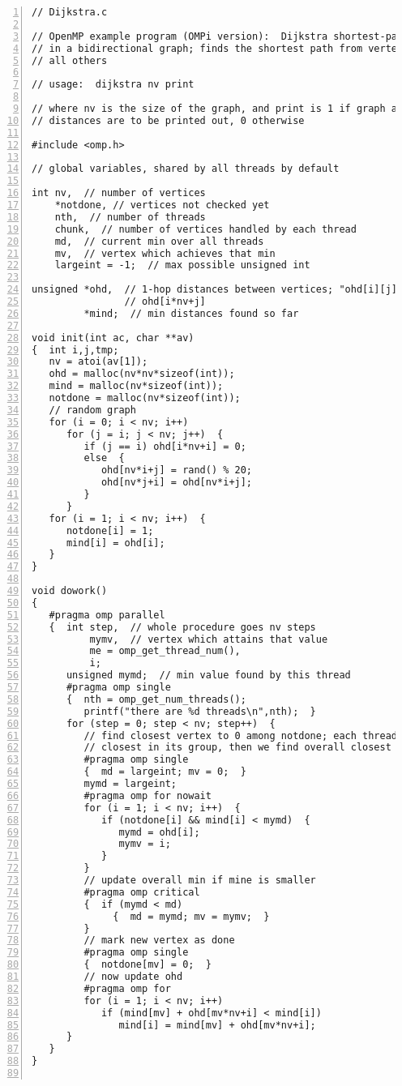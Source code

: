 \begin{Verbatim}[fontsize=\relsize{-2},numbers=left]
// Dijkstra.c

// OpenMP example program (OMPi version):  Dijkstra shortest-path finder
// in a bidirectional graph; finds the shortest path from vertex 0 to
// all others

// usage:  dijkstra nv print

// where nv is the size of the graph, and print is 1 if graph and min
// distances are to be printed out, 0 otherwise

#include <omp.h>

// global variables, shared by all threads by default

int nv,  // number of vertices
    *notdone, // vertices not checked yet
    nth,  // number of threads
    chunk,  // number of vertices handled by each thread
    md,  // current min over all threads
    mv,  // vertex which achieves that min
    largeint = -1;  // max possible unsigned int

unsigned *ohd,  // 1-hop distances between vertices; "ohd[i][j]" is
                // ohd[i*nv+j]
         *mind;  // min distances found so far

void init(int ac, char **av)
{  int i,j,tmp;
   nv = atoi(av[1]);
   ohd = malloc(nv*nv*sizeof(int));
   mind = malloc(nv*sizeof(int));
   notdone = malloc(nv*sizeof(int));
   // random graph
   for (i = 0; i < nv; i++)
      for (j = i; j < nv; j++)  {
         if (j == i) ohd[i*nv+i] = 0;
         else  {
            ohd[nv*i+j] = rand() % 20;
            ohd[nv*j+i] = ohd[nv*i+j];
         }
      }
   for (i = 1; i < nv; i++)  {
      notdone[i] = 1;
      mind[i] = ohd[i];
   }
}

void dowork()
{
   #pragma omp parallel
   {  int step,  // whole procedure goes nv steps
          mymv,  // vertex which attains that value
          me = omp_get_thread_num(),
          i;
      unsigned mymd;  // min value found by this thread
      #pragma omp single
      {  nth = omp_get_num_threads();
         printf("there are %d threads\n",nth);  }
      for (step = 0; step < nv; step++)  {
         // find closest vertex to 0 among notdone; each thread finds
         // closest in its group, then we find overall closest
         #pragma omp single
         {  md = largeint; mv = 0;  }
         mymd = largeint;
         #pragma omp for nowait
         for (i = 1; i < nv; i++)  {
            if (notdone[i] && mind[i] < mymd)  {
               mymd = ohd[i];
               mymv = i;
            }
         }
         // update overall min if mine is smaller
         #pragma omp critical
         {  if (mymd < md)
              {  md = mymd; mv = mymv;  }
         }
         // mark new vertex as done
         #pragma omp single
         {  notdone[mv] = 0;  }
         // now update ohd
         #pragma omp for
         for (i = 1; i < nv; i++)
            if (mind[mv] + ohd[mv*nv+i] < mind[i])
               mind[i] = mind[mv] + ohd[mv*nv+i];
      }
   }
}


\end{Verbatim}
